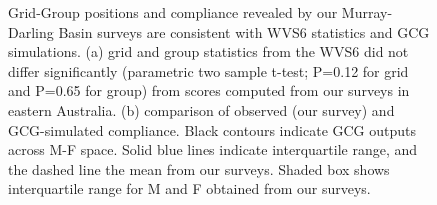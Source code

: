 \documentclass[12pt, a4paper]{article}
\begin{document}
\begin{figure}
	\caption{Grid-Group positions and compliance revealed by our Murray-Darling Basin surveys \autocite{Holley:2015te} are consistent with WVS6 statistics and GCG simulations. (a) grid and group statistics from the WVS6 did not differ significantly (parametric two sample t-test; P=0.12 for grid and P=0.65 for group) from scores computed from our surveys in eastern Australia. (b) comparison of observed (our survey) and GCG-simulated compliance. Black contours indicate GCG outputs across M-F space. Solid blue lines indicate interquartile range, and the dashed line the mean from our surveys. Shaded box shows interquartile range for M and F obtained from our surveys.} \label{fig: CH3_GCG1_WVS-MDB validation}
	\begin{center}
	\end{center}
\end{figure} 
\end{document}
